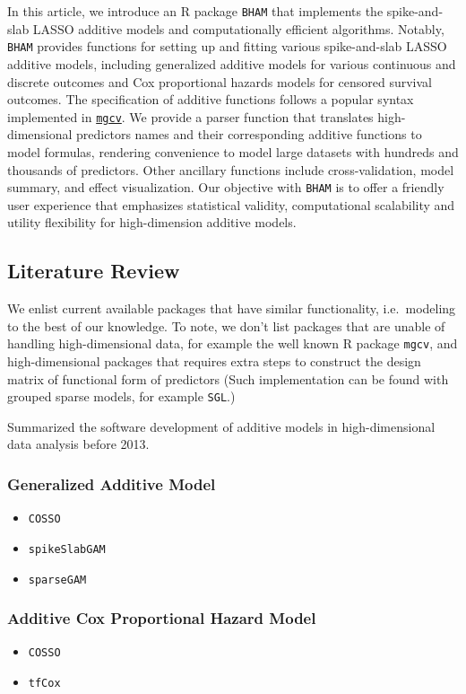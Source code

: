 \documentclass[
]{jss}
\begin{document}
In this article, we introduce an R package \texttt{BHAM} that implements
the spike-and-slab LASSO additive models and computationally efficient
algorithms. Notably, \texttt{BHAM} provides functions for setting up and
fitting various spike-and-slab LASSO additive models, including
generalized additive models for various continuous and discrete outcomes
and Cox proportional hazards models for censored survival outcomes. The
specification of additive functions follows a popular syntax implemented
in
\href{https://cran.r-project.org/web/packages/mgcv/index.html}{\texttt{mgcv}}.
We provide a parser function that translates high-dimensional predictors
names and their corresponding additive functions to model formulas,
rendering convenience to model large datasets with hundreds and
thousands of predictors. Other ancillary functions include
cross-validation, model summary, and effect visualization. Our objective
with \texttt{BHAM} is to offer a friendly user experience that
emphasizes statistical validity, computational scalability and utility
flexibility for high-dimension additive models.

\subsection{Literature Review}

We enlist current available packages that have similar functionality,
i.e.~modeling to the best of our knowledge. To note, we don't list
packages that are unable of handling high-dimensional data, for example
the well known R package \texttt{mgcv}, and high-dimensional packages
that requires extra steps to construct the design matrix of functional
form of predictors (Such implementation can be found with grouped sparse
models, for example \texttt{SGL}.)

\cite{scheipl2013} Summarized the software development of additive
models in high-dimensional data analysis before 2013.

\subsubsection{Generalized Additive Model}
\begin{itemize}
\item \texttt{COSSO}
\item \texttt{spikeSlabGAM}
\item \texttt{sparseGAM}
\end{itemize}

\subsubsection{Additive Cox Proportional Hazard Model}
\begin{itemize}
\item \texttt{COSSO}
\item \texttt{tfCox}
\end{itemize}
\end{document}
